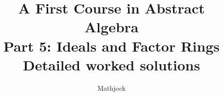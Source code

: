 
\title{\textbf{A First Course in Abstract Algebra}\\[0.3em]Part 5: Ideals and Factor Rings\\[0.3em]\large Detailed worked solutions}
\author{Mathjock}
\date{}

\maketitle
\bookinfo
\tableofcontents
\clearpage
\renewcommand{\thesection}{26}
\renewcommand{\theHsection}{fraleigh.26}

\clearpage
\renewcommand{\thesection}{27}
\renewcommand{\theHsection}{fraleigh.27}

\clearpage
\renewcommand{\thesection}{28}
\renewcommand{\theHsection}{fraleigh.28}


